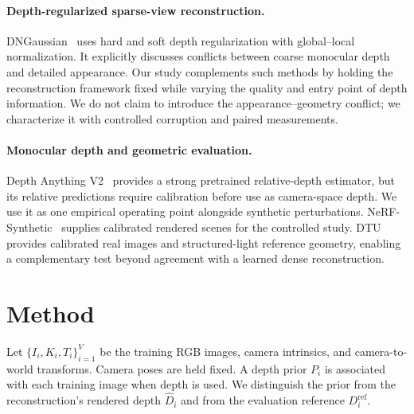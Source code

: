 \documentclass[10pt,a4paper]{article}
\begin{document}
\paragraph{Depth-regularized sparse-view reconstruction.} DNGaussian~\cite{li2024}
uses hard and soft depth regularization with global--local normalization. It
explicitly discusses conflicts between coarse monocular depth and detailed
appearance. Our study complements such methods by holding the reconstruction framework fixed while varying the quality and
entry point of depth information. We do not claim to introduce the
appearance--geometry conflict; we characterize it with controlled corruption and
paired measurements.

\paragraph{Monocular depth and geometric evaluation.} Depth Anything
V2~\cite{yang2024} provides a strong pretrained relative-depth estimator, but its
relative predictions require calibration before use as camera-space depth. We use it
as one empirical operating point alongside synthetic perturbations.
NeRF-Synthetic~\cite{mildenhall2020} supplies calibrated rendered scenes for the
controlled study. DTU~\cite{jensen2014} provides calibrated real images and
structured-light reference geometry, enabling a complementary test beyond agreement
with a learned dense reconstruction.

\section{Method}

Let $\{I_i, K_i, T_i\}_{i=1}^{V}$ be the training RGB images, camera intrinsics, and
camera-to-world transforms. Camera poses are held fixed. A depth prior $P_i$ is
associated with each training image when depth is used. We distinguish the prior from
the reconstruction's rendered depth $\widehat{D}_i$ and from the evaluation reference
$D_i^{\mathrm{ref}}$.
\end{document}
